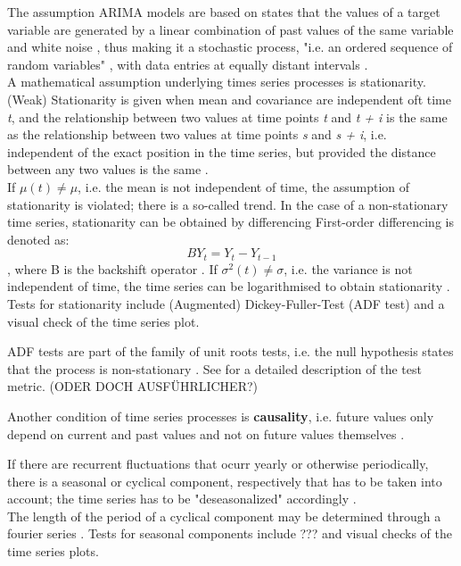 \documentclass[a4paper, 11pt]{article}
\begin{document}
The assumption ARIMA models are based on states that the values of a target variable are generated by a linear combination of past values of the same variable and white noise \citep{Khandelwal.2015}, thus making it a stochastic process, "i.e. an ordered sequence of random variables" \citep{Andreoni.2006b}, with data entries at equally distant intervals \citep{Hunt.2003}.\\
A mathematical assumption underlying times series processes is stationarity.
(Weak) Stationarity is given when mean and covariance are independent oft time \textit{t}, and the relationship between two values at time points \textit{t} and \textit{t + i} is the same as the relationship between two values at time points \textit{s} and \textit{s + i}, i.e. independent of the exact position in the time series, but provided the distance between any two values is the same \citep{Vogel.2015}.\\
If $\mu(t) \neq \mu$, i.e. the mean is not independent of time, the assumption of stationarity is violated; there is a so-called trend. In the case of a non-stationary time series, stationarity can be obtained by differencing \citep{Andreoni.2006b, Hunt.2003}
First-order differencing is denoted as:
\begin{equation}
	BY_{t} = Y_{t} - Y_{t-1}
\end{equation}
, where B is the backshift operator \citep{Hunt.2003}.
If $\sigma^2(t) \neq \sigma$, i.e. the variance is not independent of time, the time series can be logarithmised to obtain stationarity \citep{Andreoni.2006b}.
Tests for stationarity include (Augmented) Dickey-Fuller-Test (ADF test) \citep{Zhao.07022018} and a visual check of the time series plot. 

ADF tests are part of the family of unit roots tests, i.e. the null hypothesis states that the process is non-stationary \citep{Zhao.07022018}. See \cite{Vogel.2015} for a detailed description of the test metric. (ODER DOCH AUSFÜHRLICHER?)

Another condition of time series processes is \textbf{causality}, i.e. future values only depend on current and past values and not on future values themselves \citep{Vogel.2015}.

If there are recurrent fluctuations that ocurr yearly or otherwise periodically, there is a seasonal or cyclical component, respectively \citep{Vogel.2015} that has to be taken into account; the time series has to be "deseasonalized" accordingly \citep{Benkachcha.2015}.\\ The length of the period of a cyclical component may be determined through a fourier series \citep{Vogel.2015}.
Tests for seasonal components include ??? and visual checks of the time series plots.
\end{document}
